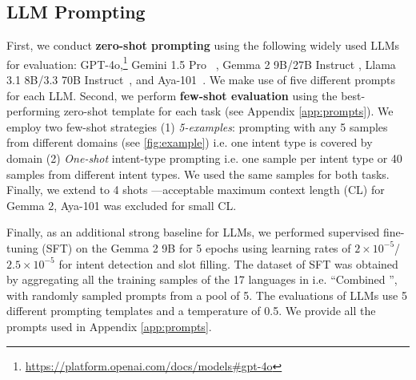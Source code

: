 
\subsection{LLM Prompting} 
First, we conduct \textbf{zero-shot prompting} using the following widely used LLMs for evaluation: GPT-4o,\footnote{\url{https://platform.openai.com/docs/models\#gpt-4o}} Gemini 1.5 Pro~\citep{Reid2024Gemini1U}%
, Gemma 2 9B/27B Instruct \cite{Gemma2}, Llama 3.1 8B/3.3 70B Instruct~\cite{Llama3}, and Aya-101~\cite{aya}. We make use of five different prompts for each LLM. Second, we perform \textbf{few-shot evaluation} using the best-performing zero-shot template for each task (see Appendix \ref{app:prompts}). We employ two few-shot strategies (1) \textit{5-examples}: prompting with any 5 samples from different domains (see \autoref{fig:example}) i.e. one intent type is covered by domain (2) \textit{One-shot} intent-type prompting i.e. one sample per intent type or 40 samples from different intent types. We used the same samples for both tasks. Finally, we extend to 4 shots ---acceptable maximum context length (CL) for Gemma 2, Aya-101 was excluded for small CL.

Finally, as an additional strong baseline for LLMs, we performed supervised fine-tuning (SFT) on the Gemma 2 9B for 5 epochs using learning rates of $2\times10^{-5}$/ $2.5\times10^{-5}$ for intent detection and slot filling. The dataset of SFT was obtained by aggregating all the training samples of the 17 languages in \dataset{} i.e. ``Combined \dataset{}'', with randomly sampled prompts from a pool of 5. The evaluations of LLMs use 5 different prompting templates and a temperature of 0.5. We provide all the prompts used in Appendix \ref{app:prompts}.

